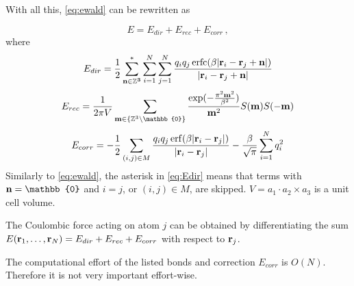 \documentclass[12pt,a4paper,notitlepage]{report}
\newcommand{\draft}[1]{#1}
\DeclareMathOperator\erf{erf}
\DeclareMathOperator\erfc{erfc}
\begin{document}
With all this, \eqref{eq:ewald} can be rewritten as

\[E = E_{dir} + E_{rec} + E_{corr}\,\mathrm{,}\]
where
\begin{equation} \label{eq:Edir}
E_{dir} = \frac{1}{2}\sum\limits_{\bold{n\in \mathbb{Z}^3}}^*\sum\limits_{i=1}^N\sum\limits_{j=1}^N\frac{q_i q_j \erfc(\beta\lvert\bold{r}_i - \bold{r}_j + \bold{n} \rvert)}{\lvert\bold{r}_i - \bold{r}_j + \bold{n} \rvert}
\end{equation}
\begin{equation} \label{eq:Erec}
E_{rec}=\frac{1}{2\pi V}\sum\limits_{\bold{m} \in \{\mathbb{Z}^3 \setminus \mathbb{0}\}}\frac{\exp(-\frac{\pi^2\bold{m}^2}{\beta^2})}{\bold{m}^2}S(\bold{m})S(\bold{-m})
\end{equation}
\[E_{corr} = -\frac{1}{2}\sum\limits_{(i,j)\in M}\frac{q_i q_j \erf(\beta\lvert\bold{r}_i - \bold{r}_j\rvert)}{\lvert\bold{r}_i - \bold{r}_j\rvert} - \frac{\beta}{\sqrt{\pi}}\sum\limits_{i=1}^N q_i^2\]
Similarly to \eqref{eq:ewald}, the asterisk in \eqref{eq:Edir} means that terms with $\bold{n} = \mathbb{0}$ and $i = j$, or $(i,j)\in M$, are skipped.
$V = a_1 \cdot a_2 \times a_3$ is a unit cell volume.

The Coulombic force acting on atom $j$ can be obtained by differentiating the sum $E(\bold{r}_1, \dotsc, \bold{r}_N) = E_{dir} + E_{rec} + E_{corr}$ with respect to $\bold{r}_j$. 

The computational effort of the listed bonds and correction $E_{corr}$ is $O(N)$. Therefore it is not very important effort-wise.
\end{document}
